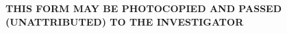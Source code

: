 
\pagestyle{empty}
\setlength{\textwidth}{17.5cm}
\setlength{\textheight}{26.5cm}
\setlength{\oddsidemargin}{-0.7cm}
\setlength{\evensidemargin}{-0.7cm}
\setlength{\topmargin}{-1.5cm}
\setlength{\headheight}{0cm}
\setlength{\headsep}{0cm}
\def\RULE{\vspace*{1mm}\hrule\vspace*{2mm}}
%
\def\tick{\raisebox{-1.5ex}{\Large\quad\quad$\surd$}}
%
\def\NL{\newline}
\def\NLL{\newline \newline}             %
\def\NLLL{\newline \newline \newline}   %
\def\NLLLL{\newline \newline \newline \newline}
%
\def\VS{\vspace*{3mm}}
\def\vs{\vspace*{1mm}}
%
\def\SUB{\VS \large \bf}
%

\parindent 0cm
\parskip 2mm

{\bf
THIS FORM MAY BE PHOTOCOPIED AND PASSED (UNATTRIBUTED) TO THE
INVESTIGATOR}


